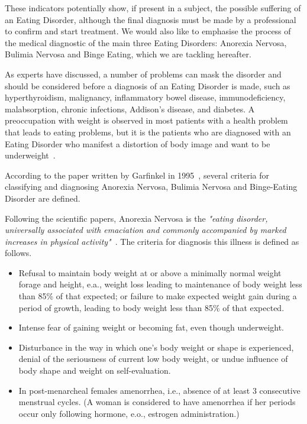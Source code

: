 These indicators potentially show, if present in a subject, the possible suffering of an Eating Disorder, although the final diagnosis must be made by a professional to confirm and start treatment. We would also like to emphasise the process of the medical diagnostic of the main three Eating Disorders: Anorexia Nervosa, Bulimia Nervosa and Binge Eating, which we are tackling hereafter.


As experts have discussed, a number of problems can mask the disorder and should be considered before a diagnosis of an Eating Disorder is made, such as hyperthyroidism, malignancy, inflammatory bowel disease, immunodeficiency, malabsorption, chronic infections, Addison's disease, and diabetes. A preoccupation with weight is observed in most patients with a health problem that leads to eating problems, but it is the patients who are diagnosed with an Eating Disorder who manifest a distortion of body image and want to be underweight~\cite{pritts2003diagnosis}.

According to the paper written by Garfinkel in 1995~\cite{garfinkel1995views}, several criteria for classifying and diagnosing Anorexia Nervosa, Bulimia Nervosa and Binge-Eating Disorder are defined.


Following the scientific papers, Anorexia Nervosa is the \textit{"eating disorder, universally associated with emaciation and commonly accompanied by marked increases in physical activity"}~\cite{bulik2005anorexia}. The criteria for diagnosis this illness is defined as follows.
\begin{itemize}
    \item Refusal to maintain body weight at or above a minimally normal weight forage and height, e.a., weight loss leading to maintenance of body weight less than 85\% of that expected; or failure to make expected weight gain during a period of growth, leading to body weight less than 85\% of that expected.
    \item Intense fear of gaining weight or becoming fat, even though underweight.
    \item Disturbance in the way in which one's body weight or shape is experienced, denial of the seriousness of current low body weight, or undue influence of body shape and weight on self-evaluation.
    \item In post-menarcheal females amenorrhea, i.e., absence of at least 3 consecutive menstrual cycles. (A woman is considered to have amenorrhea if her periods occur only following hormone, e.o., estrogen administration.)
\end{itemize}

